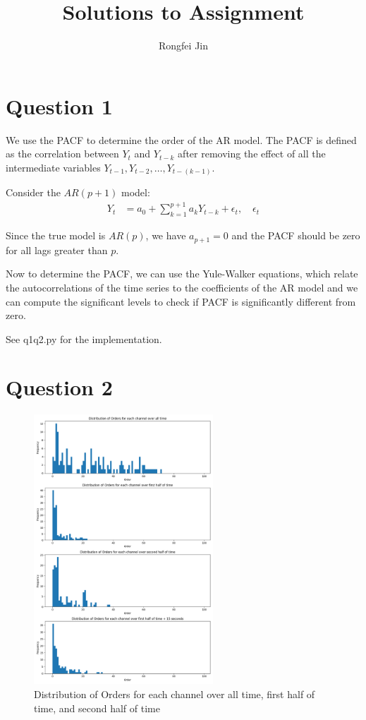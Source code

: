 \documentclass{article}
\title{Solutions to Assignment }
\author{Rongfei Jin}
\begin{document}
\pagestyle{fancy}
\fancyhf{}%
\fancyfoot[C]{\thepage}%
\maketitle

\section*{Question 1}

We use the PACF to determine the order of the AR model. The PACF is defined as the correlation between $Y_t$ and $Y_{t-k}$ after removing the effect of all the intermediate variables $Y_{t-1}, Y_{t-2}, \ldots, Y_{t-(k-1)}$.

Consider the \(AR(p+1)\) model:
\begin{align*} 
Y_t &= a_0 + \sum_{k=1}^{p+1} a_k Y_{t-k} + \epsilon_t, \quad \epsilon_t
\end{align*}

Since the true model is \(AR(p)\), we have \(a_{p+1} = 0\) and the PACF should be zero for all lags greater than \(p\).

Now to determine the PACF, we can use the Yule-Walker equations, which relate the autocorrelations of the time series to the coefficients of the AR model and we can compute the significant levels to check if PACF is significantly different from zero.

See q1q2.py for the implementation.
\newpage
\section*{Question 2}

\begin{figure}[h!]
    \centering
    \includegraphics[width=0.6\textwidth]{figs/q2.png}
    \caption{Distribution of Orders for each channel over all time, first half of time, and second half of time}
    \label{fig:q2}
\end{figure}
\end{document}
